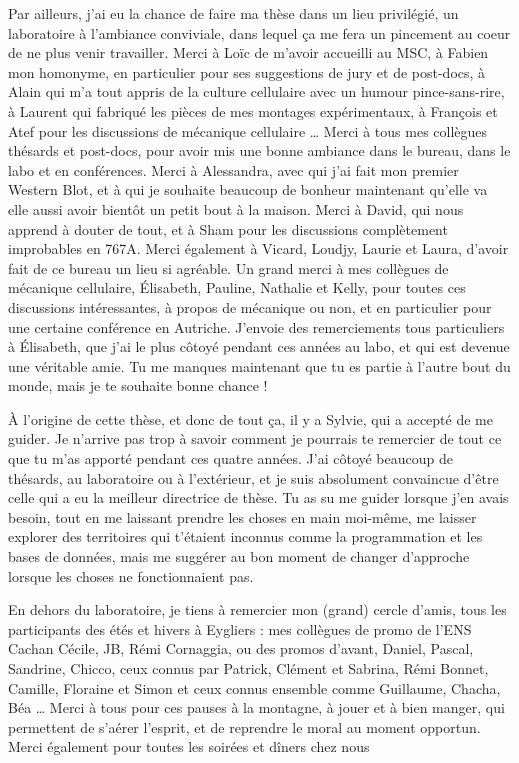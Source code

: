 Par ailleurs, j'ai eu la chance de faire ma thèse dans un lieu privilégié, un laboratoire à l'ambiance conviviale, dans lequel ça me fera un pincement au coeur de ne plus venir travailler. Merci à Loïc de m'avoir accueilli au MSC, à Fabien mon homonyme, en particulier pour ses suggestions de jury et de post-docs, à Alain qui m'a tout appris de la culture cellulaire avec un humour pince-sans-rire, à Laurent qui fabriqué les pièces de mes montages expérimentaux, à François et Atef pour les discussions de mécanique cellulaire \dots
Merci à tous mes collègues thésards et post-docs, pour avoir mis une bonne ambiance dans le bureau, dans le labo et en conférences. Merci à Alessandra, avec qui j'ai fait mon premier Western Blot, et à qui je souhaite beaucoup de bonheur maintenant qu'elle va elle aussi avoir bientôt un petit bout à la maison. Merci à David, qui nous apprend à douter de tout, et à Sham pour les discussions complètement improbables en 767A. Merci également à Vicard, Loudjy, Laurie et Laura, d'avoir fait de ce bureau un lieu si agréable. 
Un grand merci à mes collègues de mécanique cellulaire, Élisabeth, Pauline, Nathalie et Kelly, pour toutes ces discussions intéressantes, à propos de mécanique ou non, et en particulier pour une certaine conférence en Autriche. J'envoie des remerciements tous particuliers à Élisabeth, que j'ai le plus côtoyé pendant ces années au labo, et qui est devenue une véritable amie. Tu me manques maintenant que tu es partie à l'autre bout du monde, mais je te souhaite bonne chance !

À l'origine de cette thèse, et donc de tout ça, il y a Sylvie, qui a accepté de me guider. Je n'arrive pas trop à savoir comment je pourrais te remercier de tout ce que tu m'as apporté pendant ces quatre années. J'ai côtoyé beaucoup de thésards, au laboratoire ou à l'extérieur, et je suis absolument convaincue d'être celle qui a eu la meilleur directrice de thèse. Tu as su me guider lorsque j'en avais besoin, tout en me laissant prendre les choses en main moi-même, me laisser explorer des territoires qui t'étaient inconnus comme la programmation et les bases de données, mais me suggérer au bon moment de changer d'approche lorsque les choses ne fonctionnaient pas.

En dehors du laboratoire, je tiens à remercier mon (grand) cercle d'amis, tous les participants des étés et hivers à Eygliers : mes collègues de promo de l'ENS Cachan Cécile, JB, Rémi Cornaggia, ou des promos d'avant, Daniel, Pascal, Sandrine, Chicco, ceux connus par Patrick, Clément et Sabrina, Rémi Bonnet, Camille, Floraine et Simon et ceux connus ensemble comme Guillaume, Chacha, Béa \dots
Merci à tous pour ces pauses à la montagne, à jouer et à bien manger, qui permettent de s'aérer l'esprit, et de reprendre le moral au moment opportun. Merci également pour toutes les soirées et dîners chez nous 